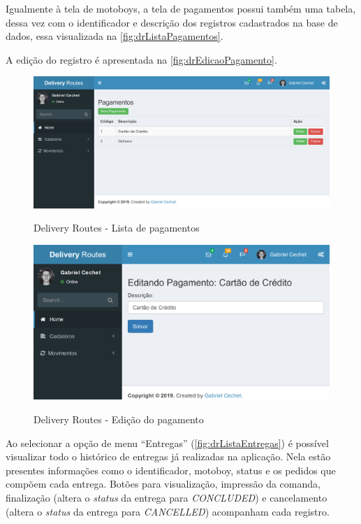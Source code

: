 \newpage
Igualmente à tela de motoboys, a tela de pagamentos possui também uma tabela, dessa vez com o identificador e descrição dos registros cadastrados na base de dados, essa visualizada na \autoref{fig:drListaPagamentos}. 

A edição do registro é apresentada na \autoref{fig:drEdicaoPagamento}.

\begin{figure}[H]
    \centering
    \caption{Delivery Routes - Lista de pagamentos}
    \includegraphics[width=1.0\textwidth]{./dados/figuras/fig20}
    \label{fig:drListaPagamentos}
\end{figure}

\begin{figure}[H]
    \centering
    \caption{Delivery Routes - Edição do pagamento}
    \includegraphics[width=1.0\textwidth]{./dados/figuras/fig21}
    \label{fig:drEdicaoPagamento}
\end{figure}

\newpage
Ao selecionar a opção de menu “Entregas” (\autoref{fig:drListaEntregas}) é possível visualizar todo o histórico de entregas já realizadas na aplicação. Nela estão presentes informações como o identificador, motoboy, status e os pedidos que compõem cada entrega. Botões para visualização, impressão da comanda, finalização (altera o \textit{status} da entrega para \textit{CONCLUDED}) e cancelamento (altera o \textit{status} da entrega para \textit{CANCELLED}) acompanham cada registro.


